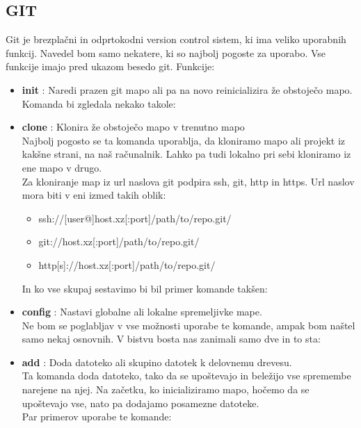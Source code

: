 {\color{indiagreen}\subsection{GIT}}
Git je brezplačni in odprtokodni version control sistem, ki ima veliko uporabnih funkcij. Navedel bom samo nekatere, ki so najbolj pogoste za uporabo.
Vse funkcije imajo pred ukazom besedo git.
Funkcije:
\begin{itemize} 
	\item \textbf{init} : Naredi prazen git mapo ali pa na novo reinicializira že obstoječo mapo.\\
	Komanda bi zgledala nekako takole:\\
	\item \textbf{clone} : Klonira že obstoječo mapo v trenutno mapo\\
	Najbolj pogosto se ta komanda uporablja, da kloniramo mapo ali projekt iz kakšne strani, na naš računalnik. Lahko pa tudi lokalno pri sebi kloniramo iz ene mapo v drugo.\\
	Za kloniranje map iz url naslova git podpira ssh, git, http in https. Url naslov mora biti v eni izmed takih oblik:
	\begin{itemize}
		\item ssh://[user@]host.xz[:port]/path/to/repo.git/
		\item git://host.xz[:port]/path/to/repo.git/
		\item http[s]://host.xz[:port]/path/to/repo.git/ 
	\end{itemize}
	In ko vse skupaj sestavimo bi bil primer komande takšen:\\
	\item \textbf{config} : Nastavi globalne ali lokalne spremeljivke mape.\\
	Ne bom se poglabljav v vse možnosti uporabe te komande, ampak bom naštel samo nekaj osnovnih. V bistvu bosta nas zanimali samo dve in to sta:\\
	\item \textbf{add} : Doda datoteko ali skupino datotek k delovnemu drevesu.\\
	Ta komanda doda datoteko, tako da se upoštevajo in beležijo vse spremembe narejene na njej. Na začetku, ko inicializiramo mapo, hočemo da se upoštevajo vse, nato pa dodajamo posamezne datoteke.\\
	Par primerov uporabe te komande:\\

\end{itemize}
